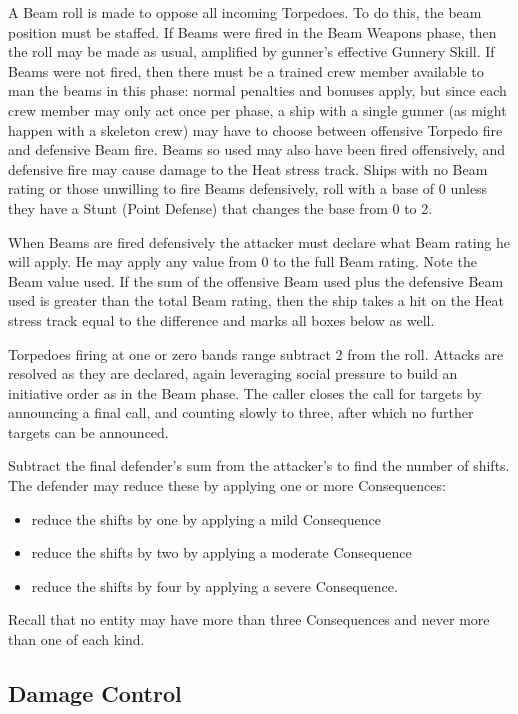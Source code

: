 A Beam roll is made to oppose all incoming Torpedoes. To do this, the beam position must be staffed. If Beams were fired in the Beam Weapons phase, then the roll may be made as usual, amplified by gunner's effective Gunnery Skill. If Beams were not fired, then there must be a trained crew member available to man the beams in this phase: normal penalties and bonuses apply, but since each crew member may only act once per phase, a ship with a single gunner (as might happen with a skeleton crew) may have to choose between offensive Torpedo fire and defensive Beam fire. Beams so used may also have been fired offensively, and defensive fire may cause damage to the Heat stress track. Ships with no Beam rating or those unwilling to fire Beams defensively, roll with a base of 0 unless they have a Stunt (Point Defense) that changes the base from 0 to 2.

When Beams are fired defensively the attacker must declare what Beam rating he will apply. He may apply any value from 0 to the full Beam rating. Note the Beam value used. If the sum of the offensive Beam used plus the defensive Beam used is greater than the total Beam rating, then the ship takes a hit on the Heat stress track equal to the difference and marks all boxes below as well.

Torpedoes firing at one or zero bands range subtract 2 from the roll. Attacks are resolved as they are declared, again leveraging social pressure to build an initiative order as in the Beam phase. The caller closes the call for targets by announcing a final call, and counting slowly to three, after which no further targets can be announced.

Subtract the final defender's sum from the attacker's to find the number of shifts. The defender may reduce these by applying one or more Consequences:
\begin{itemize}
\item reduce the shifts by one by applying a mild Consequence
\item reduce the shifts by two by applying a moderate Consequence
\item reduce the shifts by four by applying a severe Consequence.
\end{itemize}

Recall that no entity may have more than three Consequences and never more than one of each kind.

\subsection{Damage Control}\label{sec:Damage Control} %

